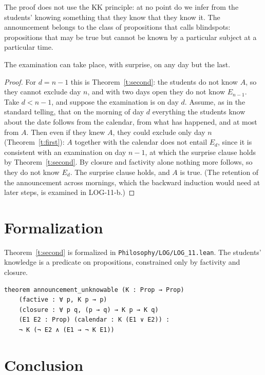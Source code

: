 \documentclass{situationist-preprint}
\begin{document}
The proof does not use the KK principle: at no point do we infer from the students' knowing something that they know that they know it. The announcement belongs to the class of propositions that \citet{Sorensen1988} calls blindspots: propositions that may be true but cannot be known by a particular subject at a particular time.

\begin{corollary}\label{c:any}
The examination can take place, with surprise, on any day but the last.
\end{corollary}

\begin{proof}
For $d = n-1$ this is Theorem~\ref{t:second}: the students do not know $A$, so they cannot exclude day $n$, and with two days open they do not know $E_{n-1}$. Take $d < n-1$, and suppose the examination is on day $d$. Assume, as in the standard telling, that on the morning of day $d$ everything the students know about the date follows from the calendar, from what has happened, and at most from $A$. Then even if they knew $A$, they could exclude only day $n$ (Theorem~\ref{t:first}): $A$ together with the calendar does not entail $E_d$, since it is consistent with an examination on day $n-1$, at which the surprise clause holds by Theorem~\ref{t:second}. By closure and factivity alone nothing more follows, so they do not know $E_d$. The surprise clause holds, and $A$ is true. (The retention of the announcement across mornings, which the backward induction would need at later steps, is examined in LOG-11-b.)
\end{proof}

\section{Formalization}

Theorem~\ref{t:second} is formalized in \nolinkurl{Philosophy/LOG/LOG_11.lean}. The students' knowledge is a predicate on propositions, constrained only by factivity and closure.

\begin{lstlisting}
theorem announcement_unknowable (K : Prop → Prop)
    (factive : ∀ p, K p → p)
    (closure : ∀ p q, (p → q) → K p → K q)
    (E1 E2 : Prop) (calendar : K (E1 ∨ E2)) :
    ¬ K (¬ E2 ∧ (E1 → ¬ K E1))
\end{lstlisting}

\section{Conclusion}
\end{document}
